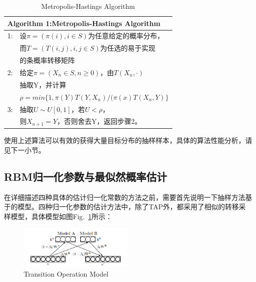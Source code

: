 \documentclass[journal,a4paper]{IEEEtran}
\begin{document}
	\begin{table}[h]
	\centering
		\begin{tabular}{ll}
			\hline
			\multicolumn{2}{l}{\textbf{Algorithm 1:}Metropolis-Hastings Algorithm} \\
			\hline
			1: & 设$\pi = (\pi(i), i\in S)$为任意给定的概率分布，\\
			 & 而$ T = (T(i,j), i,j\in S)$为任选的易于实现 \\
			 & 的条概率转移矩阵\\
			2: & 给定$\pi = (X_n\in S, n\geq 0)$，由$T(X_n,·) $ \\
			 & 抽取Y，并计算\\
			 & $ \rho = min\{ 1,\pi(Y)T(Y,X_n)/(\pi(x)T(X_n,Y) \} $ \\
			3: & 抽取$ U \sim U[0,1]$，若$ U <\rho$， \\
			 & 则$ X_{n+1} = Y$，否则舍去Y，返回步骤2。\\
			\hline
		\end{tabular}
		\caption{Metropolis-Hastings Algorithm}
		\label{tab1}
	\end{table}

	使用上述算法可以有效的获得大量目标分布的抽样样本，具体的算法性能分析，请见下一小节。

	\subsection{RBM归一化参数与最似然概率估计}

	在详细描述四种具体的估计归一化常数的方法之前，需要首先说明一下抽样方法基于的模型。四种归一化参数的估计方法中，除了TAP外，都采用了相似的转移采样模型，具体模型如图Fig.~\ref{fig2}所示：
	\begin{figure}[h]
		\includegraphics[width = 0.5\textwidth]{2.jpg}
		\caption{Transition Operation Model}
		\label{fig2}
	\end{figure}
	
\end{document}
